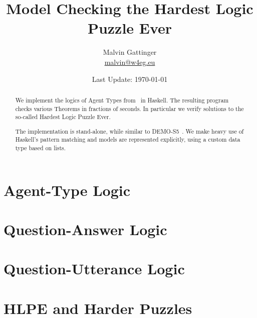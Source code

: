 \documentclass[12pt,a4paper]{article}
\title{Model Checking the Hardest Logic Puzzle Ever}
\author{Malvin Gattinger \\ \href{mailto:malvin@w4eg.eu}{malvin@w4eg.eu}}
\date{Last Update: \today}
\begin{document}
\maketitle

\begin{abstract}
We implement the logics of Agent Types from~\cite{liuWang2013:agentTypesHLPE} in Haskell.
The resulting program checks various Theorems in fractions of seconds.
In particular we verify solutions to the so-called Hardest Logic Puzzle Ever.

The implementation is stand-alone, while similar to DEMO-S5~\cite{JvE:DEMO}.
We make heavy use of Haskell's pattern matching and models are represented explicitly, using a custom data type based on lists.
\end{abstract}

\vfill

\tableofcontents

\section{Agent-Type Logic}


\section{Question-Answer Logic}


\section{Question-Utterance Logic}


\section{HLPE and Harder Puzzles}




\end{document}
